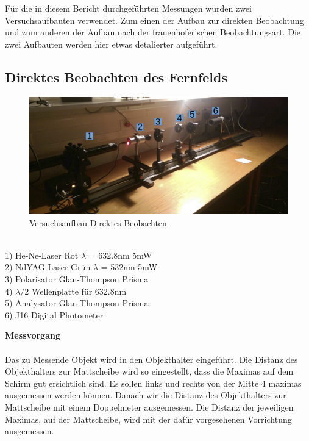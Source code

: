 Für die in diesem Bericht durchgeführten Messungen wurden zwei Versuchsaufbauten verwendet. Zum einen der Aufbau zur direkten Beobachtung und zum anderen der Aufbau nach der frauenhofer'schen Beobachtungsart. Die zwei Aufbauten werden hier etwas detalierter aufgeführt.

\subsection{Direktes Beobachten des Fernfelds} \label{sec:direkt}
\begin{figure}[htb]
\center
\includegraphics[width=\textwidth]{graphics/versuchsaufbau.png}
\caption{Versuchsaufbau Direktes Beobachten} %
\label{fig:direkt}
\end{figure}
%

\begin{tabbing}
\hspace{20mm}			\= 	\\
1)	\>	He-Ne-Laser Rot $\lambda$ = 632.8nm 5mW	\\
2)	\>	NdYAG Laser Grün $\lambda$ = 532nm 5mW	\\
3)	\>	Polarisator Glan-Thompson Prisma	\\
4)	\>	$\lambda / 2$ Wellenplatte für 632.8nm	\\
5)	\>	Analysator Glan-Thompson Prisma	\\
6)	\>	J16 Digital Photometer			\\

\end{tabbing}

\textbf{Messvorgang}\\
\\
Das zu Messende Objekt wird in den Objekthalter eingeführt. Die Distanz des Objekthalters zur Mattscheibe wird so eingestellt, dass die Maximas auf dem Schirm gut ersichtlich sind. Es sollen links und rechts von der Mitte 4 maximas ausgemessen werden können. Danach wir die Distanz des Objekthalters zur Mattscheibe mit einem Doppelmeter ausgemessen. Die Distanz der jeweiligen Maximas, auf der Mattscheibe, wird mit der dafür vorgesehenen Vorrichtung ausgemessen.
\clearpage
